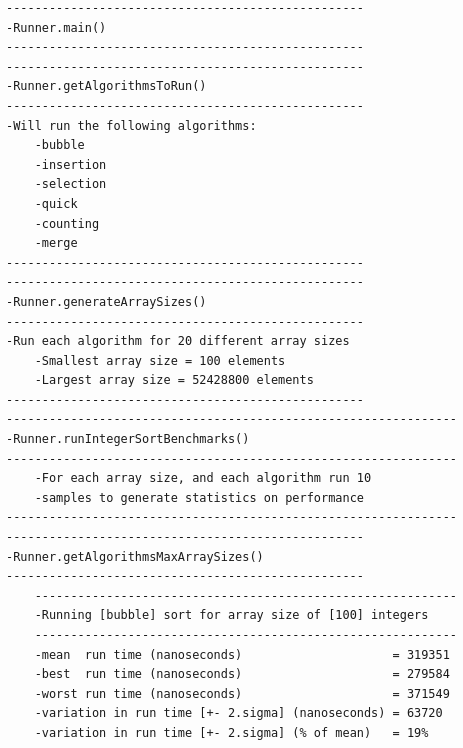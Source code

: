 \documentclass[12pt,a4paper]{article}
\begin{document}
\begin{lstlisting}[caption={Example terminal output from running the runner.Runner() method.},captionpos=b, label={terminalOutput1}]
--------------------------------------------------
-Runner.main()
--------------------------------------------------
--------------------------------------------------
-Runner.getAlgorithmsToRun()
--------------------------------------------------
-Will run the following algorithms:
	-bubble
	-insertion
	-selection
	-quick
	-counting
	-merge
--------------------------------------------------
--------------------------------------------------
-Runner.generateArraySizes()
--------------------------------------------------
-Run each algorithm for 20 different array sizes
	-Smallest array size = 100 elements
	-Largest array size = 52428800 elements
--------------------------------------------------
---------------------------------------------------------------
-Runner.runIntegerSortBenchmarks()
---------------------------------------------------------------
	-For each array size, and each algorithm run 10
	-samples to generate statistics on performance
---------------------------------------------------------------
--------------------------------------------------
-Runner.getAlgorithmsMaxArraySizes()
--------------------------------------------------
	-----------------------------------------------------------
	-Running [bubble] sort for array size of [100] integers
	-----------------------------------------------------------
	-mean  run time (nanoseconds)                     = 319351
	-best  run time (nanoseconds)                     = 279584
	-worst run time (nanoseconds)                     = 371549
	-variation in run time [+- 2.sigma] (nanoseconds) = 63720
	-variation in run time [+- 2.sigma] (% of mean)   = 19%
\end{lstlisting}

\clearpage
\end{document}
